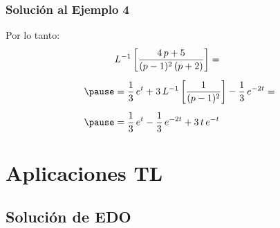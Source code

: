 \begin{frame}
\frametitle{Solución al Ejemplo 4}
Por lo tanto:
\pause
\begin{eqnarray*}
\begin{aligned}
&L^{-1} \left[ \dfrac{4 \, p + 5}{(p - 1)^{2} \, (p + 2)} \right] = \\[0.5em] \pause
&= \dfrac{1}{3} \, e^{t} +  3 \, L^{-1} \left[\dfrac{1}{(p - 1)^{2}} \right] - \dfrac{1}{3} \, e^{-2 t} = \\[0.5em] \pause
&= \dfrac{1}{3} \, e^{t} - \dfrac{1}{3} \, e^{- 2 t} + 3 \, t \, e^{-t}
\end{aligned}
\end{eqnarray*}
\end{frame}

\section{Aplicaciones TL}
\subsection{Solución de EDO}

